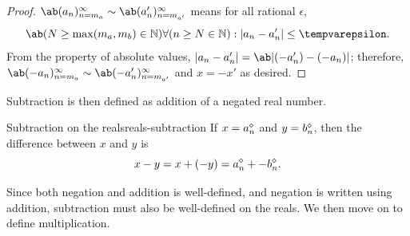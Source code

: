 \begin{proof}
  $\sequence{a_n}{n = m_a}{\infty} \sim \sequence{a_n'}{n = m_{a'}}{\infty}$ means for
  all rational $\epsilon$,
  \begin{equation}
    \ab(N \geq \max(m_a, m_b) \in \mathbb{N}) \forall (n \geq N \in \mathbb{N}) : |a_n - a_n'| \leq \epsilon.
  \end{equation}
  From the property of absolute values, $|a_n - a_n'| = \ab|(-a_n') - (-a_n)|$; therefore,
  $\sequence{-a_n}{n = m_a}{\infty} \sim \sequence{-a_n'}{n = m_{a'}}{\infty}$ and
  $x = -x'$ as desired.
\end{proof}

Subtraction is then defined as addition of a negated real number.
\begin{df}{Subtraction on the reals}{reals-subtraction}
  If $x = a_n^{\diamond}$ and $y = b_n^{\diamond}$, then the difference between $x$ and $y$ is
  \begin{equation*}
    x - y = x + (-y) = a_n^{\diamond} + -b_n^{\diamond}.
  \end{equation*}
\end{df}
Since both negation and addition is well-defined, and negation is written using addition,
subtraction must also be well-defined on the reals. We then move on to define multiplication.

